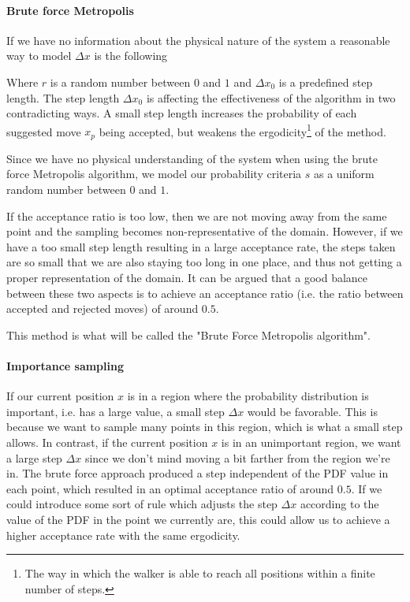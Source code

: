 \paragraph{Brute force Metropolis}

If we have no information about the physical nature of the system a reasonable way to model $\Delta x$ is the following

\eqs
{}
\eqf

Where $r$ is a random number between $0$ and $1$ and $\Delta x_0$ is a predefined step length. 
The step length $\Delta x_0$ is affecting the effectiveness of the algorithm in two contradicting ways. 
A small step length increases the probability of each suggested move $x_p$ being accepted, but weakens the ergodicity\footnote{The way in which the walker is able to reach all positions within a finite number of steps.}
of the method. 

Since we have no physical understanding of the system when using the brute force Metropolis algorithm, we model our probability criteria $s$ as a uniform random number between $0$ and $1$. 

If the acceptance ratio is too low, then we are not moving away from the same point and the sampling becomes non-representative of the domain. 
However, if we have a too small step length resulting in a large acceptance rate, the steps taken are so small that we are also staying too long in one place, and thus not getting a proper representation of the domain. 
It can be argued that a good balance between these two aspects is to achieve an acceptance ratio 
(i.e. the ratio between accepted and rejected moves) of around $0.5$. 

This method is what will be called the "Brute Force Metropolis algorithm". 

\paragraph{Importance sampling}\label{sec:theory_importance_sampling}

If our current position $x$ is in a region where the probability distribution is important, i.e. has a large value, a small step $\Delta x$ would be favorable. 
This is because we want to sample many points in this region, which is what a small step allows. 
In contrast, if the current position $x$ is in an unimportant region, we want a large step $\Delta x$ since we don't mind moving a bit farther from the region we're in. 
The brute force approach produced a step independent of the PDF value in each point, which resulted in an optimal acceptance ratio of around $0.5$. 
If we could introduce some sort of rule which adjusts the step $\Delta x$ according to the value of the PDF in the point we currently are, this could allow us to achieve a higher acceptance rate with the same ergodicity. 

